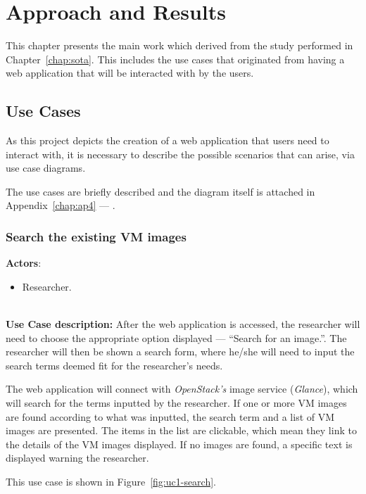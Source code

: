 \chapter{Approach and Results}\label{chap:chap4}


This chapter presents the main work which derived from the study performed in Chapter~\ref{chap:sota}. This includes the use cases that originated from having a web application that will be interacted with by the users. 

\section{Use Cases}\label{sec:use-cases}

As this project depicts the creation of a web application that users need to interact with, it is necessary to describe the possible scenarios that can arise, via use case diagrams.

The use cases are briefly described and the diagram itself is attached in Appendix~\ref{chap:ap4} --- .

\subsection{Search the existing VM images}\label{subsec:uc1}

\textbf{Actors}:

\begin{itemize}
\item Researcher.
\end{itemize}\ \\
\textbf{Use Case description:} After the web application is accessed, the researcher will need to choose the appropriate option displayed --- ``Search for an image.''. The researcher will then be shown a search form, where he/she will need to input the search terms deemed fit for the researcher's needs.

The web application will connect with \textit{OpenStack's} image service (\textit{Glance}), which will search for the terms inputted by the researcher.
If one or more VM images are found according to what was inputted, the search term and a list of VM images are presented. The items in the list are clickable, which mean they link to the details of the VM images displayed.
If no images are found, a specific text is displayed warning the researcher.

This use case is shown in Figure~\ref{fig:uc1-search}.



